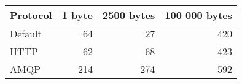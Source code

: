 \begin{tabularx}{\textwidth}{lrrr}
\hline
 Protocol   &   1 byte &   2500 bytes &   100 000 bytes \\
\hline
 Default    &       64 &           27 &             420 \\
 HTTP       &       62 &           68 &             423 \\
 AMQP       &      214 &          274 &             592 \\
\hline
\end{tabularx}